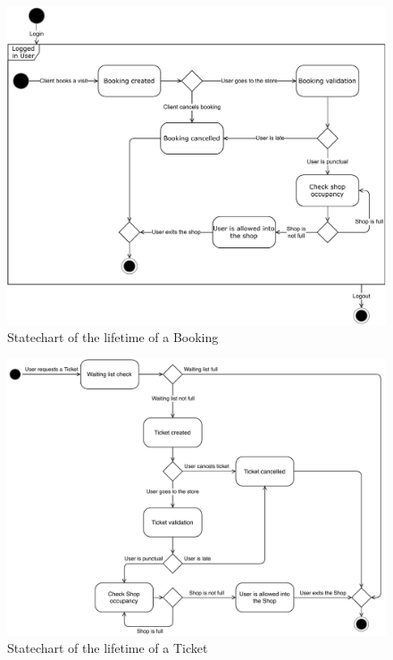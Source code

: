\begin{figure}[H]
    \includegraphics[width=\linewidth]{Images/state-diag-Booking.pdf}
    \caption{Statechart of the lifetime of a Booking}
    \label{fig:statechart_booking}
\end{figure}

\begin{figure}[H]
    \includegraphics[width=\linewidth]{Images/state-diag_Ticket.pdf}
    \caption{Statechart of the lifetime of a Ticket}
    \label{fig:statechart_ticket}
\end{figure}

